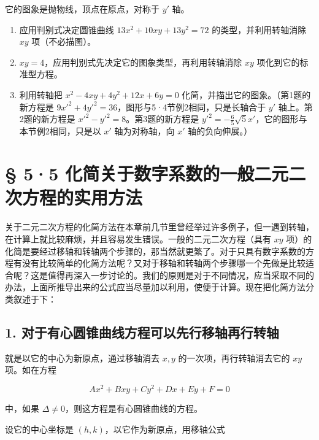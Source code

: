 它的图象是抛物线，顶点在原点，对称于 \(y'\) 轴。

\begin{enumerate}
\def\labelenumi{\arabic{enumi}.}
\item
  应用判别式决定圆锥曲线 \(13x^{2} + 10xy + 13y^{2} = 72\)
  的类型，并利用转轴消除 \(xy\) 项（不必描图）。
\item
  \(xy = 4\)，应用判别式先决定它的图象类型，再利用转轴消除 \(xy\)
  项化到它的标准型方程。
\item
  利用转轴把 \(x^{2} - 4xy + 4y^{2} + 12x + 6y = 0\)
  化简，并描出它的图象。（第1题的新方程是
  \(9x'^{2} + 4y'^{2} = 36\)，图形与5·4节例2相同，只是长轴合于 \(y'\)
  轴上。第2题的新方程是 \(x'^{2} - y'^{2} = 8\)。第3题的新方程是
  \(y'^{2} = -\frac{6}{5}\sqrt{5} x'\)，它的图形与本节例2相同，只是以
  \(x'\) 轴为对称轴，向 \(x'\) 轴的负向伸展。）
\end{enumerate}

\section{§ 5·5
化简关于数字系数的一般二元二次方程的实用方法}\label{ux5316ux7b80ux5173ux4e8eux6570ux5b57ux7cfbux6570ux7684ux4e00ux822cux4e8cux5143ux4e8cux6b21ux65b9ux7a0bux7684ux5b9eux7528ux65b9ux6cd5}

关于二元二次方程的化简方法在本章前几节里曾经举过许多例子，但一遇到转轴，在计算上就比较麻烦，并且容易发生错误。一般的二元二次方程（具有
\(xy\)
项）的化简是要经过移轴和转轴两个步骤的，那当然就更繁了。对于只具有数字系数的方程有没有比较简单的化简方法呢？又对于移轴和转轴两个步骤哪一个先做是比较适合呢？这是值得再深入一步讨论的。我们的原则是对于不同情况，应当采取不同的办法，上面所推导出来的公式应当尽量加以利用，使便于计算。现在把化简方法分类叙述于下：

\subsection{1.
对于有心圆锥曲线方程可以先行移轴再行转轴}\label{ux5bf9ux4e8eux6709ux5fc3ux5706ux9525ux66f2ux7ebfux65b9ux7a0bux53efux4ee5ux5148ux884cux79fbux8f74ux518dux884cux8f6cux8f74}

就是以它的中心为新原点，通过移轴消去 \(x, y\) 的一次项，再行转轴消去它的
\(xy\) 项。如在方程

\[
A x^{2} + B x y + C y^{2} + D x + E y + F = 0 \tag {1}
\]

中，如果 \(\Delta \neq 0\)，则这方程是有心圆锥曲线的方程。

设它的中心坐标是 \((h, k)\)，以它作为新原点，用移轴公式

